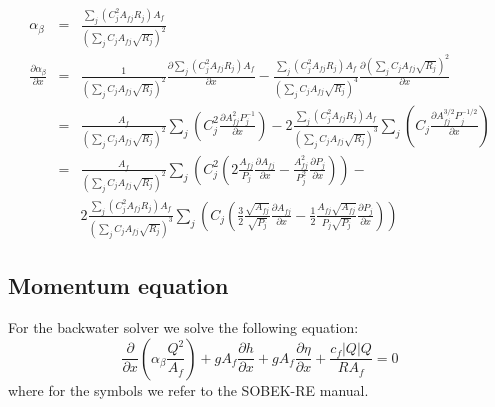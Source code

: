 \documentclass[a4paper, 11pt]{article}
\newcommand{\pa}[2]{\ensuremath{\frac{\partial #1}{\partial #2}}}
\begin{document}
\begin{eqnarray}
\nonumber
\alpha_{\beta} &=& \frac{\sum_j (C_j^2 A_{fj} R_j) A_f}{\left( \sum_j C_j A_{fj} \sqrt{R_j}\right)^2}\\
\nonumber
\pa{\alpha_{\beta}}{x} &=& \frac{1}{\left( \sum_j C_j A_{fj} \sqrt{R_j}\right)^2}\pa{\sum_j (C_j^2 A_{fj} R_j) A_f}{x}- \frac{\sum_j (C_j^2 A_{fj} R_j) A_f }{\left( \sum_j C_j A_{fj} \sqrt{R_j}\right)^4}\pa{\left( \sum_j C_j A_{fj} \sqrt{R_j}\right)^2}{x}\\
\nonumber
&=&
\frac{A_f}{\left( \sum_j C_j A_{fj} \sqrt{R_j}\right)^2}\sum_j \left(C_j^2 \pa{A^2_{fj}P_j^{-1}}{x}\right) - 2\frac{\sum_j (C_j^2 A_{fj} R_j) A_f }{\left( \sum_j C_j A_{fj} \sqrt{R_j}\right)^3}\sum_j \left( C_j \pa{A^{3/2}_{fj} P_j^{-1/2}}{x}\right)\\
\nonumber
&=&
\frac{A_f}{\left( \sum_j C_j A_{fj} \sqrt{R_j}\right)^2}\sum_j \left(C_j^2 \left(2\frac{A_{fj}}{P_j} \pa{A_{fj}}{x} - \frac{A^2_{fj}}{P_j^{2}}\pa{P_j}{x}\right)\right) - \\
\nonumber
&& 2\frac{\sum_j (C_j^2 A_{fj} R_j) A_f }{\left( \sum_j C_j A_{fj} \sqrt{R_j}\right)^3}\sum_j \left( C_j \left(\frac{3}{2}\frac{\sqrt{A_{fj}}}{\sqrt{P_j}}\pa{A_{fj}}{x} - \frac{1}{2}\frac{A_{fj}\sqrt{A_{fj}}}{P_j \sqrt{P_j}}\pa{P_j}{x}\right)\right)
\end{eqnarray}

\subsection{Momentum equation}
For the backwater solver we solve the following equation:
\begin{equation}
\pa{}{x}\left(\alpha_{\beta} \frac{Q^2}{A_f}\right) + gA_f \pa{h}{x} + gA_f \pa{\eta}{x} + \frac{c_f|Q|Q}{RA_f} = 0
\end{equation}
where for the symbols we refer to the SOBEK-RE manual.\\
\end{document}
